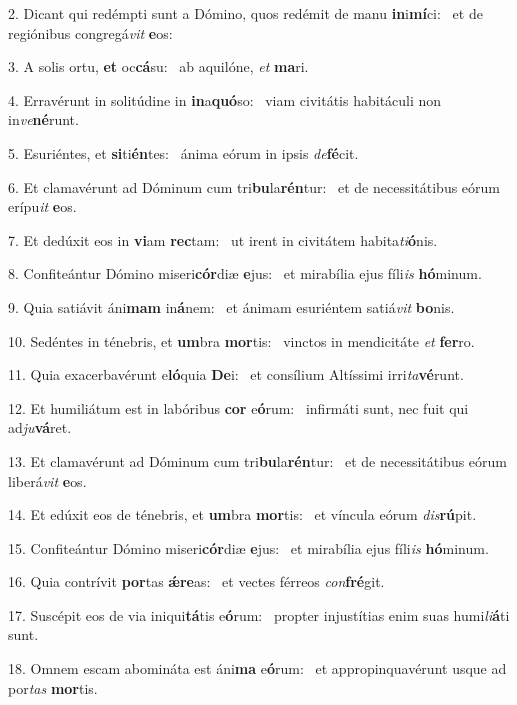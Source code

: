 2. Dicant qui redémpti sunt a Dómino, quos redémit de manu \textbf{in}i\textbf{mí}ci: \ast\  et de regiónibus congregá\textit{vit} \textbf{e}os:\

3. A solis ortu, \textbf{et} oc\textbf{cá}su: \ast\  ab aquilóne, \textit{et} \textbf{ma}ri.\

4. Erravérunt in solitúdine in \textbf{in}a\textbf{quó}so: \ast\  viam civitátis habitáculi non in\textit{ve}\textbf{né}runt.\

5. Esuriéntes, et \textbf{si}ti\textbf{én}tes: \ast\  ánima eórum in ipsis \textit{de}\textbf{fé}cit.\

6. Et clamavérunt ad Dóminum cum tri\textbf{bu}la\textbf{rén}tur: \ast\  et de necessitátibus eórum erípu\textit{it} \textbf{e}os.\

7. Et dedúxit eos in \textbf{vi}am \textbf{rec}tam: \ast\  ut irent in civitátem habita\textit{ti}\textbf{ó}nis.\

8. Confiteántur Dómino miseri\textbf{cór}diæ \textbf{e}jus: \ast\  et mirabília ejus fíli\textit{is} \textbf{hó}minum.\

9. Quia satiávit áni\textbf{mam} in\textbf{á}nem: \ast\  et ánimam esuriéntem satiá\textit{vit} \textbf{bo}nis.\

10. Sedéntes in ténebris, et \textbf{um}bra \textbf{mor}tis: \ast\  vinctos in mendicitáte \textit{et} \textbf{fer}ro.\

11. Quia exacerbavérunt e\textbf{ló}quia \textbf{De}i: \ast\  et consílium Altíssimi irri\textit{ta}\textbf{vé}runt.\

12. Et humiliátum est in labóribus \textbf{cor} e\textbf{ó}rum: \ast\  infirmáti sunt, nec fuit qui ad\textit{ju}\textbf{vá}ret.\

13. Et clamavérunt ad Dóminum cum tri\textbf{bu}la\textbf{rén}tur: \ast\  et de necessitátibus eórum liberá\textit{vit} \textbf{e}os.\

14. Et edúxit eos de ténebris, et \textbf{um}bra \textbf{mor}tis: \ast\  et víncula eórum \textit{dis}\textbf{rú}pit.\

15. Confiteántur Dómino miseri\textbf{cór}diæ \textbf{e}jus: \ast\  et mirabília ejus fíli\textit{is} \textbf{hó}minum.\

16. Quia contrívit \textbf{por}tas \textbf{ǽ}\textbf{re}as: \ast\  et vectes férreos \textit{con}\textbf{fré}git.\

17. Suscépit eos de via iniqui\textbf{tá}tis e\textbf{ó}rum: \ast\  propter injustítias enim suas humi\textit{li}\textbf{á}ti sunt.\

18. Omnem escam abomináta est áni\textbf{ma} e\textbf{ó}rum: \ast\  et appropinquavérunt usque ad por\textit{tas} \textbf{mor}tis.\

